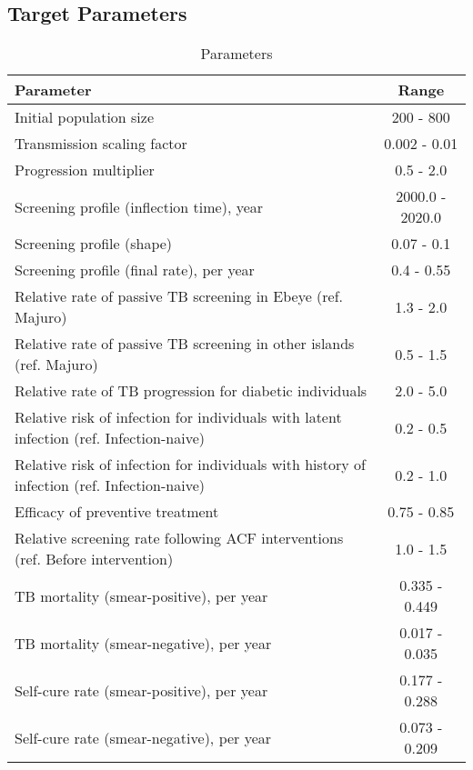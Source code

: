\subsection{Target Parameters}
\begin{table}[!ht]
    \caption {Parameters} 
    \centering
    \begin{tabular}{ |l|c| }
        \hline
            Parameter  & Range  \\ \hline
            Initial population size  & 200 - 800  \\ \hline
            Transmission scaling factor  & 0.002 - 0.01  \\ \hline
            Progression multiplier  & 0.5 - 2.0  \\ \hline
            Screening profile (inflection time), year  & 2000.0 - 2020.0  \\ \hline
            Screening profile (shape)  & 0.07 - 0.1  \\ \hline
            Screening profile (final rate), per year  & 0.4 - 0.55  \\ \hline
            Relative rate of passive TB screening in Ebeye (ref. Majuro)  & 1.3 - 2.0  \\ \hline
            Relative rate of passive TB screening in other islands (ref. Majuro)  & 0.5 - 1.5  \\ \hline
            Relative rate of TB progression for diabetic individuals  & 2.0 - 5.0  \\ \hline
            Relative risk of infection for individuals with latent infection (ref. Infection-naive)  & 0.2 - 0.5  \\ \hline
            Relative risk of infection for individuals with history of infection (ref. Infection-naive)  & 0.2 - 1.0  \\ \hline
            Efficacy of preventive treatment  & 0.75 - 0.85  \\ \hline
            Relative screening rate following ACF interventions (ref. Before intervention)  & 1.0 - 1.5  \\ \hline
            TB mortality (smear-positive), per year  & 0.335 - 0.449  \\ \hline
            TB mortality (smear-negative), per year  & 0.017 - 0.035  \\ \hline
            Self-cure rate (smear-positive), per year  & 0.177 - 0.288  \\ \hline
            Self-cure rate (smear-negative), per year  & 0.073 - 0.209  \\ \hline
        \end{tabular}
    \end{table}

